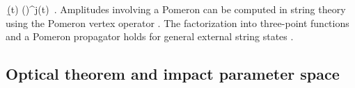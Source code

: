 \times {}  
\,\b(t) \left(\right)^{j(t)}
\,.
\label{eq:Pomeron_factorization}
\eeq
Amplitudes involving a Pomeron can be computed in string theory using the Pomeron vertex operator \cite{Ademollo:1989ag,Ademollo:1990sd,Brower:2006ea}. The factorization into three-point functions and a Pomeron propagator holds for general external string states \cite{Brower:2006ea,DAppollonio:2013mgj}.

\subsection{Optical theorem and impact parameter space}
\label{sec:impact_optical_theorem_flat}

